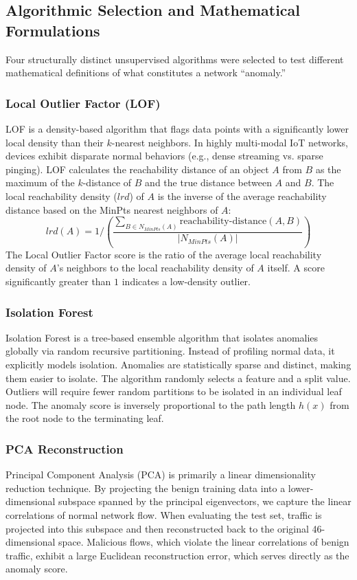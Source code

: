 \documentclass{article}
\begin{document}
\subsection{Algorithmic Selection and Mathematical Formulations}

Four structurally distinct unsupervised algorithms were selected to test different mathematical definitions of what constitutes a network ``anomaly.''

\subsubsection{Local Outlier Factor (LOF)}
LOF \cite{lof_paper} is a density-based algorithm that flags data points with a significantly lower local density than their $k$-nearest neighbors. In highly multi-modal IoT networks, devices exhibit disparate normal behaviors (e.g., dense streaming vs. sparse pinging). LOF calculates the reachability distance of an object $A$ from $B$ as the maximum of the $k$-distance of $B$ and the true distance between $A$ and $B$. The local reachability density ($lrd$) of $A$ is the inverse of the average reachability distance based on the MinPts nearest neighbors of $A$:
$$ lrd(A) = 1 / \left( \frac{\sum_{B \in N_{MinPts}(A)} \text{reachability-distance}(A, B)}{|N_{MinPts}(A)|} \right) $$
The Local Outlier Factor score is the ratio of the average local reachability density of $A$'s neighbors to the local reachability density of $A$ itself. A score significantly greater than $1$ indicates a low-density outlier.

\subsubsection{Isolation Forest}
Isolation Forest \cite{isolation_forest} is a tree-based ensemble algorithm that isolates anomalies globally via random recursive partitioning. Instead of profiling normal data, it explicitly models isolation. Anomalies are statistically sparse and distinct, making them easier to isolate. The algorithm randomly selects a feature and a split value. Outliers will require fewer random partitions to be isolated in an individual leaf node. The anomaly score is inversely proportional to the path length $h(x)$ from the root node to the terminating leaf.

\subsubsection{PCA Reconstruction}
Principal Component Analysis (PCA) is primarily a linear dimensionality reduction technique. By projecting the benign training data into a lower-dimensional subspace spanned by the principal eigenvectors, we capture the linear correlations of normal network flow. When evaluating the test set, traffic is projected into this subspace and then reconstructed back to the original 46-dimensional space. Malicious flows, which violate the linear correlations of benign traffic, exhibit a large Euclidean reconstruction error, which serves directly as the anomaly score.
\end{document}
